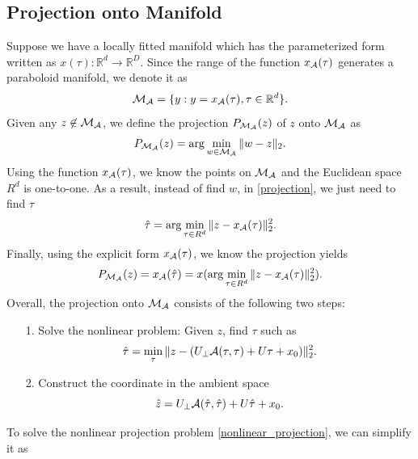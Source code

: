 \documentclass{article}
\theoremstyle{remark}
\begin{document}
\subsection{Projection onto Manifold}
Suppose we have a locally fitted manifold which has the parameterized form written as $x(\tau): {\mathbb R}^d\rightarrow {\mathbb R}^D$.
Since the range of the function $x_{\cal A}(\tau)$ generates a paraboloid manifold, we denote it as 
\[
{\cal M}_{\cal A} = \{y: y = x_{\cal A}(\tau), \tau\in {\mathbb R}^d\}.
\]
Given any $z\not\in{\cal M}_{\cal A}$, we define the projection $P_{{\cal M}_{\cal A}}(z)$  of $z$ onto ${\cal M}_{\cal A}$ as
\begin{equation}\label{projection}
P_{{\cal M}_{\cal A}}(z) = \arg\min_{w \in {\cal M}_{\cal A} }\|w-z\|_2.
\end{equation}
Using the function $x_{\cal A}(\tau)$, we know the points on ${\cal M}_{\cal A}$ and the Euclidean space $R^d$ is one-to-one. As a result, instead of find $w$, in \eqref{projection}, we just need to find $\tau$
\begin{equation}\label{projection_tau}
 \hat{\tau} = \arg\min_{\tau\in R^d }\|z-x_{\cal A}(\tau)\|_2^2.
\end{equation}
Finally, using the explicit form $x_{\cal A}(\tau)$, we know the projection yields
\[
P_{{\cal M}_{\cal A}}(z) = x_{\cal A}(\hat{\tau})=x(\arg\min_{\tau\in R^d }\|z-x_{\cal A}(\tau)\|_2^2).
\]
Overall, the projection onto ${\cal M}_{\cal A}$ consists of the following two steps:
\begin{itemize}
\item[1.] Solve the nonlinear problem: Given $z$, find $\tau$ such as 
\begin{equation}\label{nonlinear_projection}
\hat{\tau} = \min_\tau \|z -  (U_{\perp} {\cal A} (\tau,\tau) + U \tau +x_0)\|_2^2.
\end{equation}
\item[2.] Construct the coordinate in the ambient space
\[
\hat{z} = U_{\perp} {\cal A} (\hat{\tau},\hat{\tau}) + U \hat{\tau} +x_0.
\]
\end{itemize}
To solve the nonlinear projection problem \eqref{nonlinear_projection}, we can simplify it as
\end{document}
